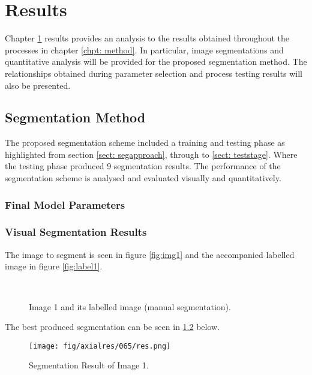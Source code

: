 \chapter{Results}
\label{chpt: results}
Chapter \ref{chpt: results} results provides an analysis to the results obtained throughout the processes in chapter \ref{chpt: method}. In particular, image segmentations and quantitative analysis  will be provided for the proposed segmentation method. The relationships obtained during parameter selection and process testing results will also be presented. 


\section{Segmentation Method}
The proposed segmentation scheme included a training and testing phase as highlighted from section \ref{sect: segapproach}, through to \ref{sect: teststage}. Where the testing phase produced 9 segmentation results. The performance of the segmentation scheme is analysed and evaluated visually and quantitatively. 

\subsection{Final Model Parameters}

\subsection{Visual Segmentation Results}
The image to segment is seen in figure \ref{fig:img1} and the accompanied labelled image in figure \ref{fig:label1}.

\begin{figure}[H]
    \centering
    \\
    \caption{Image 1 and its labelled image (manual segmentation).}%
    \label{fig:image1}
\end{figure}

The best produced segmentation can be seen in \ref{fig:res1} below.

\begin{figure}[H]
\centering
\texttt{[image: fig/axialres/065/res.png]}
\caption{Segmentation Result of Image 1.}
\label{fig:res1}
\end{figure}

